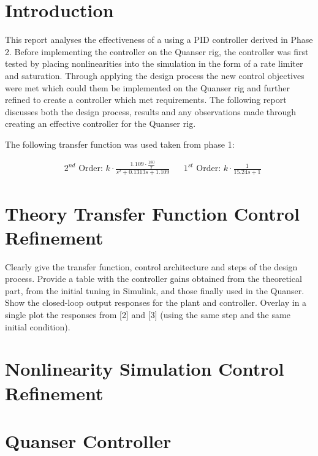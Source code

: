 \section{Introduction}\label{introduction}

This report analyses the effectiveness of a using a PID controller
derived in Phase 2. Before implementing the controller on the Quanser
rig, the controller was first tested by placing nonlinearities into the
simulation in the form of a rate limiter and saturation. Through
applying the design process the new control objectives were met which
could them be implemented on the Quanser rig and further refined to
create a controller which met requirements. The following report
discusses both the design process, results and any observations made
through creating an effective controller for the Quanser rig.

The following transfer function was used taken from phase 1:

\begin{align*}
&\text{$2^{nd}$ Order: }k \cdot \frac { 1.109\cdot \frac{180} {\pi} }{ s^2 + 0.1313s +1.109 }
&&\text{$1^{st}$ Order: }k \cdot \frac { 1 }{ 15.24s +1 }
\end{align*}

\section{Theory Transfer Function Control
Refinement}\label{theory-transfer-function-control-refinement}

Clearly give the transfer function, control architecture and steps of
the design process. Provide a table with the controller gains obtained
from the theoretical part, from the initial tuning in Simulink, and
those finally used in the Quanser. Show the closed-loop output responses
for the plant and controller. Overlay in a single plot the responses
from {[}2{]} and {[}3{]} (using the same step and the same initial
condition).

\section{Nonlinearity Simulation Control
Refinement}\label{nonlinearity-simulation-control-refinement}

\section{Quanser Controller}\label{quanser-controller}
